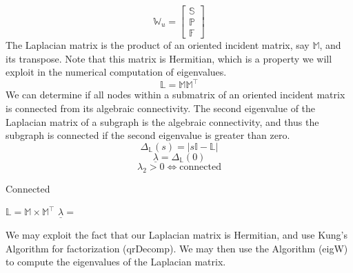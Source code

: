\documentclass{article}[11pt]
\begin{document}
%
\begin{equation}
\mathbb{W}_{u} = \left[
\begin{array}{c} 
\mathbb{S} \\ \hline
\mathbb{P} \\ \hline
\mathbb{F}
\end{array}
\right]
\label{eq:intermediateMatrix}
\end{equation}
%
The Laplacian matrix is the product of an oriented incident matrix, say $\mathbb{M}$,  and its transpose.  Note that this matrix is Hermitian, which is a property we will exploit in the numerical computation of eigenvalues.
\begin{equation}
\mathbb{L} = \mathbb{M}\mathbb{M}^{\intercal}
\label{eq:laplacianMatrix}
\end{equation}
We can determine if all nodes within a submatrix of an oriented incident matrix is connected from its algebraic connectivity.  The second eigenvalue of the Laplacian matrix of a subgraph is the algebraic connectivity, and thus the subgraph is connected if the second eigenvalue is greater than zero.  
\begin{equation} 
\Delta_{\mathbb{L}}\left(s\right) = | s\mathbb{I} - \mathbb{L} |
\label{eq:characteristicPolynomial}
\end{equation}
\begin{equation} 
\underline{\lambda} = \Delta_{\mathbb{L}}\left(0\right)
\label{eq:eigenvalues}
\end{equation}
\begin{equation} 
\lambda_{2} > 0 \Leftrightarrow \mbox{connected}
\label{eq:eigenvalues}
\end{equation}
%
\begin{algorithm}
\caption{Connected}
\label{alg:connected}
  \State {}
  \State $\mathbb{L} = \mathbb{M} \times \mathbb{M}^{\intercal}$
  \State {}
  \State $\underline{\lambda} = $
    \State {}
    \State {}
  \Else
    \State {}
  \EndIf
\EndFunction
\end{algorithm}
\newline
We may exploit the fact that our Laplacian matrix is Hermitian, and use Kung's Algorithm for  factorization (qrDecomp).  We may then use the  Algorithm (eigW) to compute the eigenvalues of the Laplacian matrix.
\newline
\end{document}

